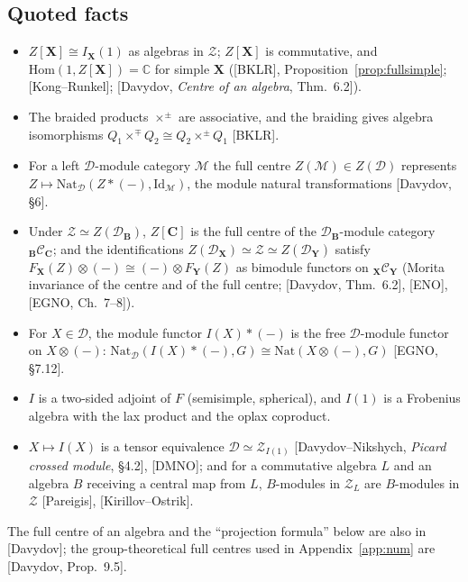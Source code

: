 \documentclass[11pt]{article}
\theoremstyle{definition}
\theoremstyle{remark}
\begin{document}
\subsection{Quoted facts}\label{sec:quoted}
\begin{itemize}[leftmargin=2.6em]
\item[(T1)] $Z[\mathbf X]\cong I_{\mathbf X}(1)$ as algebras in $\mathcal Z$; $Z[\mathbf X]$ is commutative, and $\mathrm{Hom}(1,Z[\mathbf X])=\mathbb C$ for simple $\mathbf X$ ([BKLR], Proposition~\ref{prop:fullsimple}; [Kong--Runkel]; [Davydov, \emph{Centre of an algebra}, Thm.~6.2]).
\item[(T2)] The braided products $\times^\pm$ are associative, and the braiding gives algebra isomorphisms $Q_1\times^\mp Q_2\cong Q_2\times^\pm Q_1$ [BKLR].
\item[(T3)] For a left $\mathcal D$-module category $\mathcal M$ the full centre $Z(\mathcal M)\in Z(\mathcal D)$ represents $Z\mapsto\mathrm{Nat}_{\mathcal D}(Z\ast(-),\mathrm{Id}_{\mathcal M})$, the module natural transformations [Davydov, \S6].
\item[(T4)] Under $\mathcal Z\simeq Z(\mathcal D_{\mathbf B})$, $Z[\mathbf C]$ is the full centre of the $\mathcal D_{\mathbf B}$-module category ${}_{\mathbf B}\mathcal C_{\mathbf C}$; and the identifications $Z(\mathcal D_{\mathbf X})\simeq\mathcal Z\simeq Z(\mathcal D_{\mathbf Y})$ satisfy $F_{\mathbf X}(Z)\otimes(-)\cong(-)\otimes F_{\mathbf Y}(Z)$ as bimodule functors on ${}_{\mathbf X}\mathcal C_{\mathbf Y}$ (Morita invariance of the centre and of the full centre; [Davydov, Thm.~6.2], [ENO], [EGNO, Ch.~7--8]).
\item[(T5)] For $X\in\mathcal D$, the module functor $I(X)\ast(-)$ is the free $\mathcal D$-module functor on $X\otimes(-)$: $\mathrm{Nat}_{\mathcal D}(I(X)\ast(-),G)\cong\mathrm{Nat}(X\otimes(-),G)$ [EGNO, \S7.12].
\item[(T6)] $I$ is a two-sided adjoint of $F$ (semisimple, spherical), and $I(1)$ is a Frobenius algebra with the lax product and the oplax coproduct.
\item[(T7)] $X\mapsto I(X)$ is a tensor equivalence $\mathcal D\simeq\mathcal Z_{I(1)}$ [Davydov--Nikshych, \emph{Picard crossed module}, \S4.2], [DMNO]; and for a commutative algebra $L$ and an algebra $B$ receiving a central map from $L$, $B$-modules in $\mathcal Z_L$ are $B$-modules in $\mathcal Z$ [Pareigis], [Kirillov--Ostrik].
\end{itemize}
The full centre of an algebra and the ``projection formula'' below are also in [Davydov]; the group-theoretical full centres used in Appendix~\ref{app:num} are [Davydov, Prop.~9.5].
\end{document}
